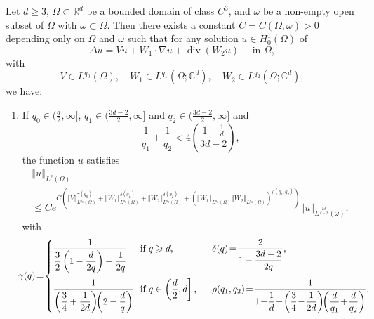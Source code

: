\documentclass[AHL,Unicode,longabstracts]{cedram}
\newcommand*\R{\mathbb{R}}
\newcommand*\C{\mathbb{C}}
\newcommand*\ds{\displaystyle}
\newcommand{\norm}[1]{\left\Vert#1\right\Vert}
\renewcommand{\geq}{\geqslant}
\renewcommand{\div}{\operatorname{div}}
\begin{document}
\begin{theo}\label{Thm-QUCP}
Let $d\geqslant 3$, $\Omega \subset \R^{d}$ be a bounded domain of class $C^3$, and $\omega$ be a non-empty open subset of $\Omega$ with $\overline \omega \subset \Omega$.
Then there exists a constant $C=C(\Omega,\omega)>0$ depending only on $\Omega$ and $\omega$ such that for any solution $u\in H^{1}_0(\Omega)$ of
\begin{equation*}
\Delta u = V u + W_1 \cdot \nabla u + \div (W_2 u) \quad \text{ in } \Omega,
\end{equation*}
with
\begin{equation*}
V\in L^{q_0}(\Omega),
\quad W_1 \in L^{q_1}\left(\Omega; \C^d\right),
\quad W_2 \in L^{q_2}\left(\Omega; \C^d\right),
\end{equation*}
we have:
\begin{enumerate}
\item\label{theo1.3.1} If $q_0 \in (\frac{d}{2}, \infty]$, $q_1 \in (\frac{3d-2}{2}, \infty]$ and $q_2\in (\frac{3d-2}{2}, \infty]$ and
\[
\frac{1}{q_1} + \frac{1}{q_2} < 4\left(\frac{1-\frac{1}{d}}{3d-2}\right),
\]
the function $u$ satisfies
\begin{multline}\label{Quantitative-0}
\norm{u }_{L^2(\Omega)} \\
\leqslant C e^{ C \left(\norm{V}_{L^{q_0}(\Omega)}^{\gamma(q_0)}+\norm{W_1}_{L^{q_1}(\Omega)}^{\delta(q_1)} + \norm{W_2}_{L^{q_2}(\Omega)}^{\delta(q_2)} + \left(\norm{W_1}_{L^{q_1}(\Omega)}\norm{W_2}_{L^{q_2}(\Omega)}\right )^{\rho(q_1,q_2)}
\right) }\norm{u}_{L^{\frac{2d}{d-2}}(\omega)},
\end{multline}
with
\begin{equation*}
\! \! \! \gamma(q)\!=\! \left\{
\begin{array}{lll} \! \! \!
\ds \frac{1}{\ds \frac{3}{2} \left(1- \frac{d}{2q}\right) + \frac{1}{2q} } & \! \! \text{if } q \geq d,
\quad & \ds \!\! \delta(q)\! = \!\frac{2}{\ds 1 - \frac{3d-2}{2q}},
\medskip
\\
\ds \! \! \! \frac{1}{ \ds \left(\frac{3}{4} + \frac{1}{2d}\right) \!\! \left(2- \frac{d}{q}\right) } & \! \! \text{if } q \in \left(\ds \frac{d}{2},d\right],
\quad & \ds \!\! \rho(q_1,q_2) \!= \! \frac{1}{\ds 1 \!-\! \frac{1}{d}\! - \!\left(\frac{3}{4} \!-\! \frac{1}{2d}\right)\!\! \left(\frac{d}{q_1}\!+\! \frac{d}{q_2} \right) }.
\end{array}
\right.
\end{equation*}


\end{enumerate}
\end{theo}
\end{document}

